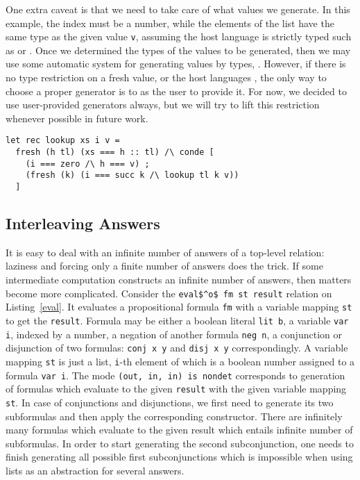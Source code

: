 One extra caveat is that we need to take care of what values we generate.
In this example, the index must be a number, while the elements of the list have the same type as the given value \lstinline{v}, assuming the host language is strictly typed such as \haskell or \ocaml.
Once we determined the types of the values to be generated, then we may use some automatic system for generating values by types, .
However, if there is no type restriction on a fresh value, or the host languages , the only way to choose a proper generator is to as the user to provide it.
For now, we decided to use user-provided generators always, but we will try to lift this restriction whenever possible in future work.

\begin{figure*}[!t]
  \centering
  \begin{minipage}{0.28\textwidth}
    \begin{lstlisting}[label={lookup}, caption={Lookup relation}, captionpos=b, frame=tb]
let rec lookup xs i v =
  fresh (h tl) (xs === h :: tl) /\ conde [
    (i === zero /\ h === v) ;
    (fresh (k) (i === succ k /\ lookup tl k v))
  ]
    \end{lstlisting}
  \end{minipage}
\end{figure*}

\subsection{Interleaving Answers}

It is easy to deal with an infinite number of answers of a top-level relation: laziness and forcing only a finite number of answers does the trick.
If some intermediate computation constructs an infinite number of answers, then matters become more complicated.
Consider the \lstinline{eval$^o$ fm st result} relation on Listing~\ref{eval}.
It evaluates a propositional formula \lstinline{fm} with a variable mapping \lstinline{st} to get the \lstinline{result}.
Formula may be either a boolean literal \lstinline{lit b}, a variable \lstinline{var i}, indexed by a number, a negation of another formula \lstinline{neg n}, a conjunction or disjunction of two formulas: \lstinline{conj x y} and \lstinline{disj x y} correspondingly.
A variable mapping \lstinline{st} is just a list, \lstinline{i}-th element of which is a boolean number assigned to a formula \lstinline{var i}.
The mode \lstinline{(out, in, in) is nondet} corresponds to generation of formulas which evaluate to the given \lstinline{result} with the given variable mapping \lstinline{st}.
In case of conjunctions and disjunctions, we first need to generate its two subformulas and then apply the corresponding constructor.
There are infinitely many formulas which evaluate to the given result which entails infinite number of subformulas.
In order to start generating the second subconjunction, one needs to finish generating all possible first subconjunctions which is impossible when using lists as an abstraction for several answers.

